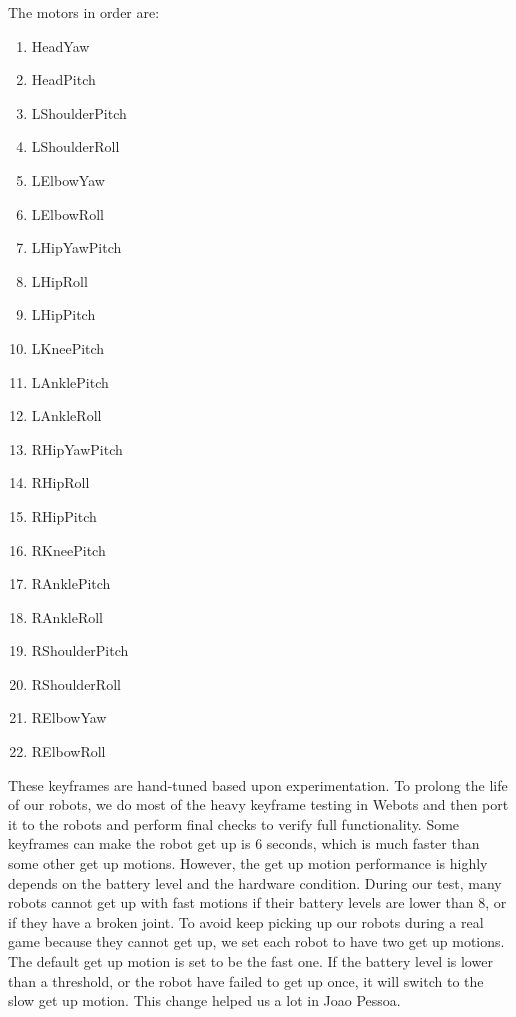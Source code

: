 \documentclass{article}
\begin{document}
  	The motors in order are:
	  \begin{multicols}{3}
		  \begin{enumerate}
			  \item HeadYaw
  			\item HeadPitch
	  		\item LShoulderPitch
		  	\item LShoulderRoll
			  \item LElbowYaw
  			\item LElbowRoll
	  		\item LHipYawPitch
		  	\item LHipRoll
			  \item LHipPitch
  			\item LKneePitch
	  		\item LAnklePitch
		  	\item LAnkleRoll
			  \item RHipYawPitch
  			\item RHipRoll
	  		\item RHipPitch
		  	\item RKneePitch
			  \item RAnklePitch
  			\item RAnkleRoll
	  		\item RShoulderPitch
		  	\item RShoulderRoll
			  \item RElbowYaw
  			\item RElbowRoll
	  	\end{enumerate}
  	\end{multicols}
These keyframes are hand-tuned based upon experimentation. To prolong the life of our robots, we do most of the heavy keyframe testing in Webots and then port it to the robots and perform final checks to verify full functionality. Some keyframes can make the robot get up is 6 seconds, which is much faster than some other get up motions. However, the get up motion performance is highly depends on the battery level and the hardware condition. During our test, many robots cannot get up with fast motions if their battery levels are lower than 8, or if they have a broken joint. To avoid keep picking up our robots during a real game because they cannot get up, we set each robot to have two get up motions. The default get up motion is set to be the fast one. If the battery level is lower than a threshold, or the robot have failed to get up once, it will switch to the slow get up motion. This change helped us a lot in Joao Pessoa. 
\end{document}
